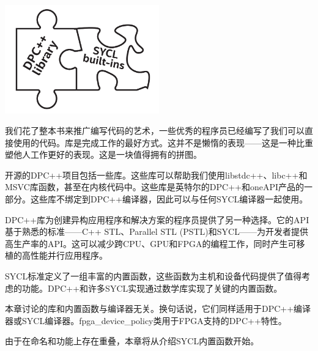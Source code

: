 \begin{center}
	\includegraphics[width=0.5\textwidth]{content/chapter-18/images/1}
\end{center}

我们花了整本书来推广编写代码的艺术，一些优秀的程序员已经编写了我们可以直接使用的代码。库是完成工作的最好方式。这并不是懒惰的表现——这是一种比重塑他人工作更好的表现。这是一块值得拥有的拼图。\par

开源的DPC++项目包括一些库。这些库可以帮助我们使用libstdc++、libc++和MSVC库函数，甚至在内核代码中。这些库是英特尔的DPC++和oneAPI产品的一部分。这些库不绑定到DPC++编译器，因此可以与任何SYCL编译器一起使用。\par

DPC++库为创建异构应用程序和解决方案的程序员提供了另一种选择。它的API基于熟悉的标准——C++ STL、Parallel STL (PSTL)和SYCL——为开发者提供高生产率的API。这可以减少跨CPU、GPU和FPGA的编程工作，同时产生可移植的高性能并行应用程序。\par

SYCL标准定义了一组丰富的内置函数，这些函数为主机和设备代码提供了值得考虑的功能。DPC++和许多SYCL实现通过数学库实现了关键的内置函数。\par

本章讨论的库和内置函数与编译器无关。换句话说，它们同样适用于DPC++编译器或SYCL编译器。fpga\_device\_policy类用于FPGA支持的DPC++特性。\par

由于在命名和功能上存在重叠，本章将从介绍SYCL内置函数开始。\par



















